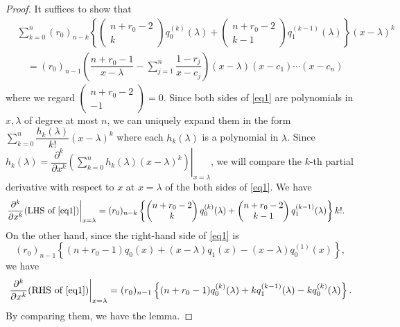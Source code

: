 \documentclass[letterpaper, 11pt]{amsart}
\theoremstyle{my theoremstyle}
\theoremstyle{dfn}
\theoremstyle{remark}
\newcommand{\dsum}{\displaystyle \sum}
\renewcommand{\1}{\mathbbm{1}}
\renewcommand{\l}{\lambda}
\numberwithin{equation}{section}
\begin{document}
\begin{proof}
It suffices to show that 
\begin{equation} \label{eq1}
\begin{split}
&\sum_{k=0}^n
(r_0)_{n-k}
\left\{ 
 \begin{pmatrix}
n+r_0-2 \\
k
\end{pmatrix}
q_0^{(k)}(\l)+ 
\begin{pmatrix}
n + r_0 -2 \\
k-1
\end{pmatrix}
q_1^{(k-1)}(\l)
\right\}
 (x-\l)^k \\
 &\quad =(r_0)_{n-1}\left(\dfrac{n+r_0-1}{x-\l} - \sum_{j=1}^n
 \dfrac{1-r_j}{x-c_j}\right) (x-\l) (x-c_1) \cdots (x-c_n) 
\end{split}
\end{equation}
where we regard $\begin{pmatrix}
n + r_0 -2 \\
-1
\end{pmatrix}=0$.
Since both sides of \eqref{eq1} are polynomials in $x,\lambda$ of degree at most $n$, we can uniquely expand them in the form $\dsum_{k=0}^n \dfrac{h_k(\lambda)}{k!}(x-\lambda)^k$ where each $h_k(\lambda)$ is a polynomial in $\lambda$.
Since $h_k(\lambda) = \left.\dfrac{\partial^k }{\partial x^k}\left(\dsum_{k=0}^n h_k(\lambda)(x-\lambda)^k\right)\right|_{x=\lambda}$, we will compare the $k$-th partial derivative with respect to $x$ at $x=\lambda$ of the both sides of \eqref{eq1}.
We have
\begin{align*} %
\left.\dfrac{\partial^k}{\partial x^k} (\text{LHS of } \eqref{eq1}) \right|_{x=\l}
&=(r_0)_{n-k} \left\{ 
 \begin{pmatrix}
n+r_0-2 \\
k
\end{pmatrix}
q_0^{(k)}(\l)+ 
\begin{pmatrix}
n + r_0 -2 \\
k-1
\end{pmatrix}
q_1^{(k-1)}(\l)
\right\} k!. 
\end{align*}
On the other hand, since the right-hand side of \eqref{eq1} is 
$$
(r_0)_{n-1} \left\{(n+r_0-1) q_0(x) + (x-\l)q_1(x) - (x-\l)q_0^{(1)}(x) \right\},
$$
we have
\begin{align*}
\left.\dfrac{\partial^k}{\partial x^k} (\text{RHS of } \eqref{eq1}) \right|_{x=\lambda} =(r_0)_{n-1}\left\{(n+r_0-1)q_0^{(k)}(\l) + kq_1^{(k-1)}(\l) - kq_0^{(k)}(\l) \right\}.
\end{align*}
By comparing them, we have the lemma. 
\end{proof}
\end{document}
